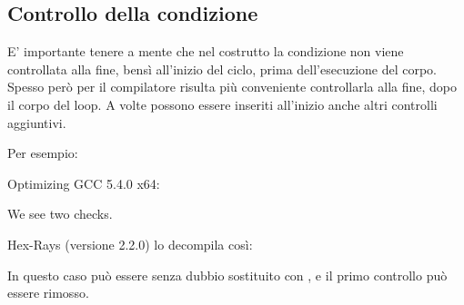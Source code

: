 \subsection{Controllo della condizione}

E' importante tenere a mente che nel costrutto  la condizione non viene controllata alla fine, bensì all'inizio del ciclo,
prima dell'esecuzione del corpo.
Spesso però per il compilatore risulta più conveniente controllarla alla fine, dopo il corpo del loop.
A volte possono essere inseriti all'inizio anche altri controlli aggiuntivi.

Per esempio:



Optimizing GCC 5.4.0 x64:



We see two checks.

Hex-Rays (versione 2.2.0) lo decompila così:



In questo caso  può essere senza dubbio sostituito con , e il primo controllo può essere rimosso.

